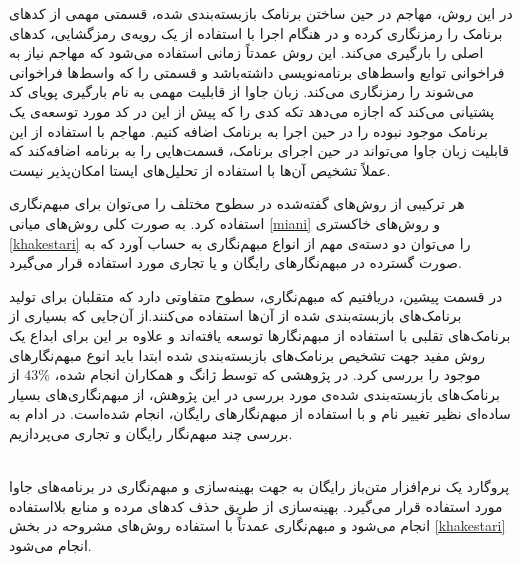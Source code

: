  در این روش، مهاجم در حین ساختن برنامک‌ بازبسته‌بندی شده، قسمتی مهمی از کد‌های برنامک را رمز‌نگاری کرده و در هنگام اجرا با استفاده از یک رویه‌ی رمز‌گشایی، کد‌های اصلی را بارگیری می‌کند. این روش عمدتاً زمانی استفاده می‌شود که مهاجم نیاز به فراخوانی توابع واسط‌های برنامه‌نویسی داشته‌باشد و قسمتی را که واسط‌ها فراخوانی می‌شوند را رمزنگاری می‌کند.
 زبان جاوا از قابلیت مهمی به نام بارگیری پویا‌ی کد پشتیانی می‌کند که اجازه می‌دهد تکه کدی را که پیش از این در کد مورد توسعه‌ی یک برنامک موجود نبوده را در حین اجرا به برنامک اضافه کنیم. مهاجم با استفاده از این قابلیت زبان‌ جاوا می‌تواند در حین اجرای برنامک، قسمت‌هایی را به برنامه اضافه‌کند که عملاً تشخیص آن‌ها با استفاده از تحلیل‌های ایستا امکان‌‌پذیر نیست.

هر ترکیبی از روش‌های گفته‌شده در سطوح مختلف را می‌توان برای مبهم‌نگاری استفاده کرد. به صورت کلی روش‌های میانی 
\ref{miani}
و روش‌های خاکستری
\ref{khakestari}
را می‌توان دو دسته‌ی مهم از انواع مبهم‌نگاری به حساب آورد که به صورت گسترده در مبهم‌نگار‌های رایگان و یا تجاری مورد استفاده قرار می‌گیرد.




در قسمت پیشین، دریافتیم که مبهم‌نگاری، سطوح متفاوتی دارد که متقلبان برای تولید برنامک‌های بازبسته‌بندی شده از آن‌ها استفاده می‌کنند.از آن‌جایی که بسیاری از برنامک‌های تقلبی با استفاده از مبهم‌نگار‌ها توسعه‌ یافته‌اند و علاوه بر این برای ابداع یک روش مفید جهت تشخیص برنامک‌های بازبسته‌بندی شده ابتدا باید انوع مبهم‌نگار‌های موجود را بررسی کرد. در پژوهشی که توسط ژانگ و همکاران انجام ‌شده،
$43\%$
از برنامک‌های بازبسته‌بندی شده‌ی مورد بررسی در این پژوهش، از مبهم‌نگاری‌های بسیار ساده‌ای نظیر تغییر نام و با استفاده از مبهم‌نگار‌های رایگان، انجام شده‌است. در ادام به بررسی چند مبهم‌نگار رایگان و تجاری می‌پردازیم. 

 \\
پروگارد یک نرم‌افزار متن‌باز رایگان به جهت بهینه‌سازی و مبهم‌نگاری در برنامه‌های جاوا مورد استفاده قرار می‌گیرد. بهینه‌سازی از طریق حذف کد‌های مرده و منابع بلااستفاده انجام می‌شود و مبهم‌نگاری عمدتاً با استفاده روش‌‌های مشروحه در بخش 
\ref{khakestari}
انجام می‌شود.

